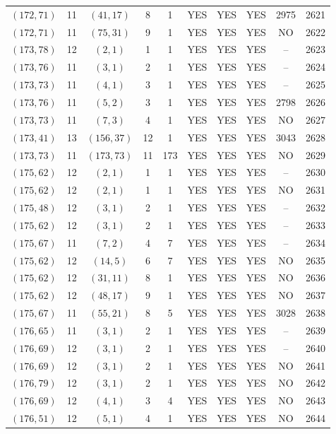 \begin{longtable}{|c|c|c|c|c|c|c|c|c|c|}
$(172, 71)$ & 11 & $(41, 17)$ & 8 & 1 & YES & YES & YES & 2975 & 2621\\
$(172, 71)$ & 11 & $(75, 31)$ & 9 & 1 & YES & YES & YES & NO & 2622\\
$(173, 78)$ & 12 & $(2, 1)$ & 1 & 1 & YES & YES & YES & -- & 2623\\
$(173, 76)$ & 11 & $(3, 1)$ & 2 & 1 & YES & YES & YES & -- & 2624\\
$(173, 73)$ & 11 & $(4, 1)$ & 3 & 1 & YES & YES & YES & -- & 2625\\
$(173, 76)$ & 11 & $(5, 2)$ & 3 & 1 & YES & YES & YES & 2798 & 2626\\
$(173, 73)$ & 11 & $(7, 3)$ & 4 & 1 & YES & YES & YES & NO & 2627\\
$(173, 41)$ & 13 & $(156, 37)$ & 12 & 1 & YES & YES & YES & 3043 & 2628\\
$(173, 73)$ & 11 & $(173, 73)$ & 11 & 173 & YES & YES & YES & NO & 2629\\
$(175, 62)$ & 12 & $(2, 1)$ & 1 & 1 & YES & YES & YES & -- & 2630\\
$(175, 62)$ & 12 & $(2, 1)$ & 1 & 1 & YES & YES & YES & NO & 2631\\
$(175, 48)$ & 12 & $(3, 1)$ & 2 & 1 & YES & YES & YES & -- & 2632\\
$(175, 62)$ & 12 & $(3, 1)$ & 2 & 1 & YES & YES & YES & -- & 2633\\
$(175, 67)$ & 11 & $(7, 2)$ & 4 & 7 & YES & YES & YES & -- & 2634\\
$(175, 62)$ & 12 & $(14, 5)$ & 6 & 7 & YES & YES & YES & NO & 2635\\
$(175, 62)$ & 12 & $(31, 11)$ & 8 & 1 & YES & YES & YES & NO & 2636\\
$(175, 62)$ & 12 & $(48, 17)$ & 9 & 1 & YES & YES & YES & NO & 2637\\
$(175, 67)$ & 11 & $(55, 21)$ & 8 & 5 & YES & YES & YES & 3028 & 2638\\
$(176, 65)$ & 11 & $(3, 1)$ & 2 & 1 & YES & YES & YES & -- & 2639\\
$(176, 69)$ & 12 & $(3, 1)$ & 2 & 1 & YES & YES & YES & -- & 2640\\
$(176, 69)$ & 12 & $(3, 1)$ & 2 & 1 & YES & YES & YES & NO & 2641\\
$(176, 79)$ & 12 & $(3, 1)$ & 2 & 1 & YES & YES & YES & NO & 2642\\
$(176, 69)$ & 12 & $(4, 1)$ & 3 & 4 & YES & YES & YES & NO & 2643\\
$(176, 51)$ & 12 & $(5, 1)$ & 4 & 1 & YES & YES & YES & NO & 2644\\

\end{longtable}
